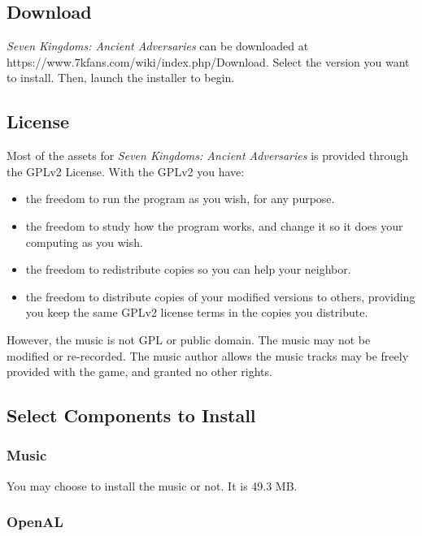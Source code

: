 \subsection{Download}


\textit{Seven Kingdoms: Ancient Adversaries} can be downloaded at \\
https://www.7kfans.com/wiki/index.php/Download. Select the version you want to install. Then, launch the installer to begin.

\subsection{License}

Most of the assets for \textit{Seven Kingdoms: Ancient Adversaries} is provided through the GPLv2 License. With the GPLv2 you have: 

\begin{itemize}
	\item the freedom to run the program as you wish, for any purpose.
	\item the freedom to study how the program works, and change it so it does your computing as you wish. 
	\item the freedom to redistribute copies so you can help your neighbor.
	\item the freedom to distribute copies of your modified versions to others, providing you keep the same GPLv2 license terms in the copies you distribute.
\end{itemize}

However, the music is not GPL or public domain. The music may not be modified or re-recorded. The music author allows the music tracks may be freely provided with the game, and granted no other rights.

\subsection{Select Components to Install}

\subsubsection{Music}

You may choose to install the music or not. It is 49.3 MB.

\subsubsection{OpenAL}

